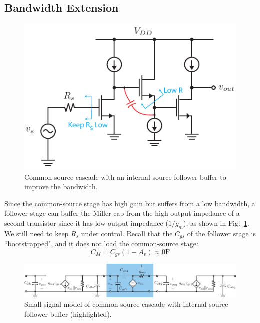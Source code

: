 \subsection{Bandwidth Extension}
\begin{figure}[tb]
\centering
\includegraphics[scale=1]{55cs_cd_cs_casc}
\caption{Common-source cascade with an internal source follower buffer to improve the bandwidth.} \label{fig:55cs_cd_cs_casc}
\end{figure}
Since the common-source stage has high gain but suffers from a low bandwidth, a follower stage can buffer the Miller cap from the high output impedance of a second transistor since it has low output impedance ($1/g_m$), as shown in Fig.~\ref{fig:55cs_cd_cs_casc}.  We still need to keep $R_s$ under control.  Recall that the $C_{gs}$ of the follower stage is ``bootstrapped", and it does not load the common-source stage:
\begin{equation}
	C_M = C_{gs} (1 - A_v) \approx 0 \mathrm{F}
\end{equation}
\begin{figure}[tb]
\centering
\includegraphics[width=\columnwidth]{5cs_cd_cs_casc_ss_miller}
\caption{Small-signal model of common-source cascade with internal source follower buffer (highlighted).}
\label{fig:5cs_cd_cs_casc_ss_miller}
\end{figure}
